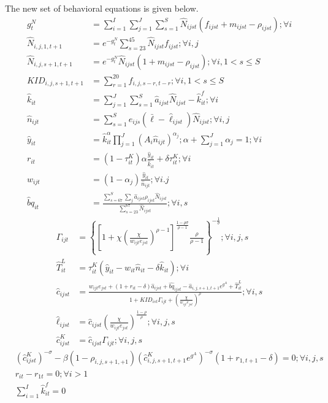 \documentclass[letterpaper,12pt]{article}
\theoremstyle{definition}
\numberwithin{equation}{section}
\begin{document}
\begin{spacing}{1.5}
	The new set of behavioral equations is given below.
	\begin{align}
		g^N_t & = \sum_{i=1}^I \sum_{j=1}^J \sum_{s=1}^S \hat N_{ijst} (f_{ijst}+m_{ijst}-\rho_{ijst}) ; \forall i\\
		\hat N_{i,j,1,t+1} & = e^{-g^N_t}\sum_{s=23}^{45} \hat N_{ijst} f_{ijst} ; \forall i,j\\
		\hat N_{i,j,s+1,t+1} & = e^{-g^N_t}\hat N_{ijst} (1+m_{ijst}-\rho_{ijst}); \forall i, 1<s\le S \\
		KID_{i,j,s+1,t+1} & = \sum_{r=1}^{20} f_{i,j,s-r,t-r}; \forall i, 1<s\le S \\
	    \hat k_{it} & = \sum_{j=1}^J \sum_{s=1}^S \hat a_{ijst} \hat N_{ijst} - \hat k_{it}^f; \forall i \\
		\hat n_{ijt} & = \sum_{s=1}^S e_{ijs} (\bar \ell - \hat \ell_{ijst}) \hat N_{ijst}; \forall i,j \\
		\hat y_{it} & = \hat k_{it}^\alpha \prod_{j=1}^J \left( A_{i} \hat n_{ijt} \right)^{\alpha_j}; \alpha + \sum_{j=1}^J \alpha_j = 1 ; \forall i \\
		r_{it} & = (1-\tau^K_{it})\alpha \frac{\hat y_{it}}{\hat k_{it}} + \delta \tau^K_{it}; \forall i \\
		w_{ijt} & = (1-\alpha_j) \frac{\hat y_{it}}{\hat n_{ijt}}; \forall i.j \\
		\hat bq_{it} & = \frac{\sum_{s=67}^S \sum_j \hat a_{ijst} \rho_{ijst} \hat N_{ijst}}{\sum_{s=23}^{67} \hat N_{ijst}} ; \forall i,s
	\end{align}
	\begin{align}
		\Gamma_{ijt} & = \left\{ \left[1 + \chi \left(\frac{\chi}{w_{ijt} e_{jst}}\right)^{\rho-1}\right]^{\tfrac{1-\rho \sigma}{\rho-1}} \frac{\rho}{\rho-1} \right\}^{-\tfrac{1}{\sigma}}; \forall i,j,s \\
		\hat T^L_{it} & = \tau^K_{it} (\hat y_{it} - w_{it}\hat n_{it} - \delta \hat k_{it}); \forall i \\
    	\hat c_{ijst} & = \frac{w_{ijt} e_{jst} + (1+r_{it}-\delta)\hat a_{ijst} + \hat{bq}_{ijst} - \hat a_{i,j,s+1,t+1} e^{g^A} + \hat T^L_{it}} {1 + KID_{ist}\Gamma_{ijt} + \left(\tfrac{\chi}{w_{ijt}e_{jst}}\right)^\rho}; \forall i,s \\
		\hat \ell_{ijst} & = \hat c_{ijst} \left(\frac{\chi}{w_{ijt}e_{jst}}\right)^{\frac{1-\rho}{\rho}} ; \forall i,j,s \\
		\hat c^K_{ijst} & = \hat c_{ijst} \Gamma_{ijt}; \forall i,j,s
	\end{align}
	\begin{align}
		& \left({\hat c^K_{ijst}}\right)^{-\sigma} - \beta (1-\rho_{i,j,s+1,+1}) \left(\hat c^K_{i,j,s+1,t+1} e^{g^A}\right)^{-\sigma}(1+r_{1,t+1}-\delta) = 0; \forall i,j,s \\
		& r_{it} - r_{1t} = 0; \forall i>1 \\
		& \sum_{i=1}^I \hat k^f_{it} = 0
	\end{align}

\end{spacing}
\end{document}
